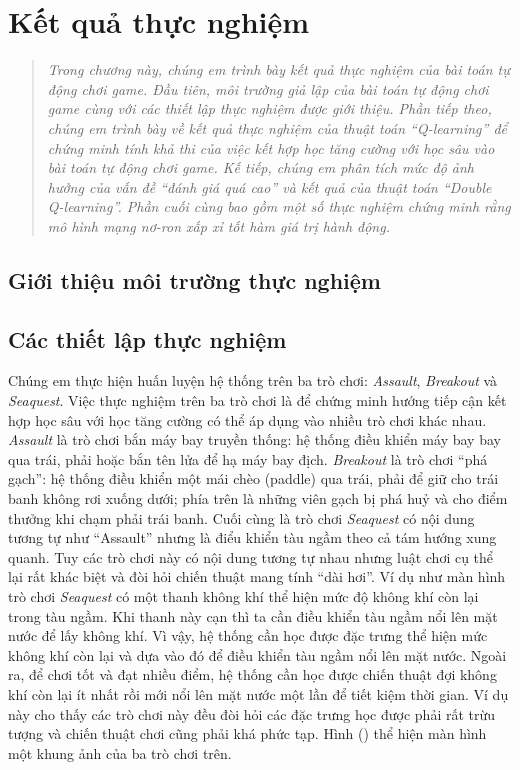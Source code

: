 \chapter{Kết quả thực nghiệm}
\ifpdf
\graphicspath{{Chapter4/Chapter4Figs/PNG/}{Chapter4/Chapter4Figs/PDF/}{Chapter4/Chapter4Figs/}}
\else
\graphicspath{{Chapter4/Chapter4Figs/EPS/}{Chapter4/Chapter4Figs/}}
\fi
\begin{quote}
	\textit{Trong chương này, chúng em trình bày kết quả thực nghiệm của bài toán tự động chơi game.
	Đầu tiên, môi trường giả lập của bài toán tự động chơi game cùng với các thiết lập thực nghiệm được giới thiệu.
	Phần tiếp theo, chúng em trình bày về kết quả thực nghiệm của thuật toán ``Q-learning'' để chứng minh tính khả thi của việc kết hợp học tăng cường với học sâu vào bài toán tự động chơi game.
	Kế tiếp, chúng em phân tích mức độ ảnh hưởng của vấn đề ``đánh giá quá cao'' và kết quả của thuật toán ``Double Q-learning''.
	Phần cuối cùng bao gồm một số thực nghiệm chứng minh rằng mô hình mạng nơ-ron xấp xỉ tốt hàm giá trị hành động.}
\end{quote}
 
\section{Giới thiệu môi trường thực nghiệm}
\section{Các thiết lập thực nghiệm}
	Chúng em thực hiện huấn luyện hệ thống trên ba trò chơi: \textit{Assault}, \textit{Breakout} và \textit{Seaquest}.
	Việc thực nghiệm trên ba trò chơi là để chứng minh hướng tiếp cận kết hợp học sâu với học tăng cường có thể áp dụng vào nhiều trò chơi khác nhau.
	\textit{Assault} là trò chơi bắn máy bay truyền thống: hệ thống điều khiển máy bay bay qua trái, phải hoặc bắn tên lửa để hạ máy bay địch.
	\textit{Breakout} là trò chơi ``phá gạch'': hệ thống điều khiển một mái chèo (paddle) qua trái, phải để giữ cho trái banh không rơi xuống dưới; phía trên là những viên gạch bị phá huỷ và cho điểm thưởng khi chạm phải trái banh.
	Cuối cùng là trò chơi \textit{Seaquest} có nội dung tương tự như ``Assault'' nhưng là điểu khiển tàu ngầm theo cả tám hướng xung quanh.
	Tuy các trò chơi này có nội dung tương tự nhau nhưng luật chơi cụ thể lại rất khác biệt và đòi hỏi chiến thuật mang tính ``dài hơi''.
	Ví dụ như màn hình trò chơi \textit{Seaquest} có một thanh không khí thể hiện mức độ không khí còn lại trong tàu ngầm.
	Khi thanh này cạn thì ta cần điều khiển tàu ngầm nổi lên mặt nước để lấy không khí.
	Vì vậy, hệ thống cần học được đặc trưng thể hiện mức không khí còn lại và dựa vào đó để điều khiển tàu ngầm nổi lên mặt nước.
	Ngoài ra, để chơi tốt và đạt nhiều điểm, hệ thống cần học được chiến thuật đợi không khí còn lại ít nhất rồi mới nổi lên mặt nước một lần để tiết kiệm thời gian.
	Ví dụ này cho thấy các trò chơi này đều đòi hỏi các đặc trưng học được phải rất trừu tượng và chiến thuật chơi cũng phải khá phức tạp.
	Hình () thể hiện màn hình một khung ảnh của ba trò chơi trên.
	
